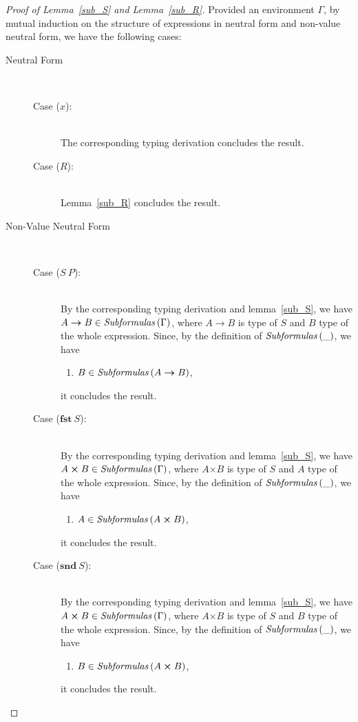 \documentclass[a4paper]{article}
\newcommand{\typarr}[2]{#1\boldsymbol{\rightarrow}#2}
\newcommand{\typprd}[2]{#1\boldsymbol{\times}#2}
\newcommand{\expvar}[1]{#1}
\newcommand{\expapp}[2]{#1\ #2}
\newcommand{\expfst}[1]{\mathbf{fst}\ #1}
\newcommand{\expsnd}[1]{\mathbf{snd}\ #1}
\newcommand{\txt}[1]{\text{\textit{#1}}}
\newcommand{\subformulas}[1]{\txt{Subformulas}\,(#1)}
\begin{document}
\begin{proof}[Proof of Lemma~\ref{sub_S} and Lemma~\ref{sub_R}]
Provided an environment $\Gamma$, by mutual induction on the structure
of expressions in neutral form and non-value neutral form, we have the
following cases:

\begin{description}

\item[Neutral Form]\ \\
\begin{description}
\item[Case ($\expvar{x}$):]\ \\ 
  The corresponding typing derivation concludes the result.
\item[Case ($R$):]\ \\
  Lemma~\ref{sub_R} concludes the result.   
\end{description}


\item[Non-Value Neutral Form]\ \\
\begin{description}
\item[Case ($\expapp{S}{P}$):]\ \\ 
  By the corresponding typing derivation and lemma~\ref{sub_S}, we
  have $\typarr{A}{B} \in \subformulas{\Gamma}$, where $\typarr{A}{B}$
  is type of $S$ and $B$ type of the whole expression. Since, by the
  definition of $\subformulas{\_}$, we have
  \begin{enumerate}[] 
  \item  $B \in \subformulas{\typarr{A}{B}}$,
  \end{enumerate}
  it concludes the result.
\item[Case ($\expfst{S}$):]\ \\
  By the corresponding typing derivation and lemma~\ref{sub_S}, we
  have $\typprd{A}{B} \in \subformulas{\Gamma}$, where $\typprd{A}{B}$
  is type of $S$ and $A$ type of the whole expression. Since, by the
  definition of $\subformulas{\_}$, we have
  \begin{enumerate}[] 
  \item $A \in \subformulas{\typprd{A}{B}}$,
  \end{enumerate}
  it concludes the result.
\item[Case ($\expsnd{S}$):]\ \\
  By the corresponding typing derivation and lemma~\ref{sub_S}, we
  have $\typprd{A}{B} \in \subformulas{\Gamma}$, where $\typprd{A}{B}$
  is type of $S$ and $B$ type of the whole expression. Since, by the
  definition of $\subformulas{\_}$, we have
  \begin{enumerate}[] 
  \item $B \in \subformulas{\typprd{A}{B}}$,
  \end{enumerate}
  it concludes the result.
\end{description}
\end{description}
\end{proof}
\end{document}
